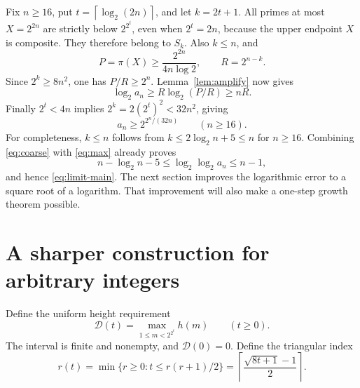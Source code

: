 \documentclass[11pt,a4paper]{article}
\theoremstyle{definition}
\theoremstyle{remark}
\renewcommand{\lg}{\log_2}
\newcommand{\ceil}[1]{\left\lceil #1\right\rceil}
\newcommand{\D}{\mathcal D}
\begin{document}
Fix $n\ge16$, put $t=\ceil{\lg(2n)}$, and let $k=2t+1$.
All primes at most $X=2^{2n}$ are strictly below $2^{2^t}$, even when
$2^t=2n$, because the upper endpoint $X$ is composite. They therefore
belong to $S_k$. Also $k\le n$, and
\[
 P=\pi(X)\ge\frac{2^{2n}}{4n\log2},\qquad R=2^{n-k}.
\]
Since $2^k\ge8n^2$, one has $P/R\ge2^n$. Lemma~\ref{lem:amplify} now gives
\[
 \lg a_n\ge R\lg(P/R)\ge nR.
\]
Finally $2^t<4n$ implies $2^k=2(2^t)^2<32n^2$, giving
\begin{equation}\label{eq:coarse}
 \boxed{\qquad a_n\ge2^{2^n/(32n)}\qquad(n\ge16).\qquad}
\end{equation}
For completeness, $k\le n$ follows from
$k\le2\lg n+5\le n$ for $n\ge16$.
Combining \eqref{eq:coarse} with \eqref{eq:max} already proves
\[
 n-\lg n-5\le\lg\lg a_n\le n-1,
\]
and hence \eqref{eq:limit-main}. The next section improves the logarithmic
error to a square root of a logarithm. That improvement will also make a
one-step growth theorem possible.

\section{A sharper construction for arbitrary integers}\label{sec:radix}
Define the uniform height requirement
\[
 \D(t)=\max_{1\le m<2^{2^t}}h(m)\qquad(t\ge0).
\]
The interval is finite and nonempty, and $\D(0)=0$.
Define the triangular index
\begin{equation}\label{eq:triangular}
 r(t)=\min\{r\ge0:t\le r(r+1)/2\}
 =\ceil{\frac{\sqrt{8t+1}-1}{2}}.
\end{equation}
\end{document}
